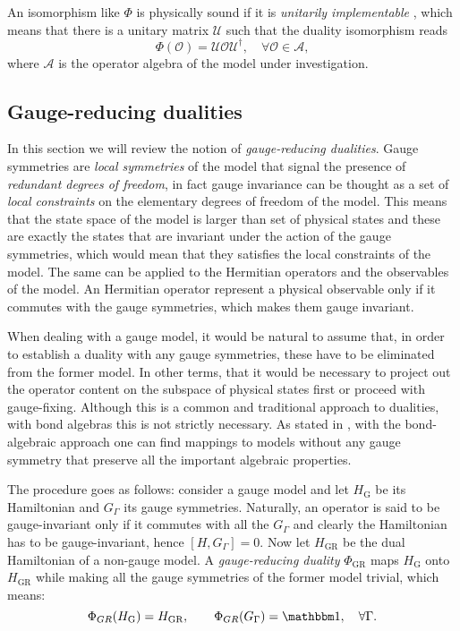 An isomorphism like $\Phi$ is physically sound if it is \emph{unitarily implementable} \cite{cobanera2011bond}, which means that there is a unitary matrix $\mathcal{U}$ such that the duality isomorphism reads
\begin{equation}
    \Phi(\mathcal{O}) =
    \mathcal{U} \mathcal{O} \mathcal{U}^{\dagger}, \quad
    \forall \mathcal{O} \in \mathcal{A},
\end{equation}
where $\mathcal{A}$ is the operator algebra of the model under investigation.



\subsection{Gauge-reducing dualities}%
\label{sub:gauge_reducing_dualities}

In this section we will review the notion of \emph{gauge-reducing dualities}.
Gauge symmetries are \emph{local symmetries} of the model that signal the presence of \emph{redundant degrees of freedom}, in fact gauge invariance can be thought as a set of \emph{local constraints} on the elementary degrees of freedom of the model.
This means that the state space of the model is larger than set of physical states and these are exactly the states that are invariant under the action of the gauge symmetries, which would mean that they satisfies the local constraints of the model.
The same can be applied to the Hermitian operators and the observables of the model.
An Hermitian operator represent a physical observable only if it commutes with the gauge symmetries, which makes them gauge invariant.

When dealing with a gauge model, it would be natural to assume that, in order to establish a duality with any gauge symmetries, these have to be eliminated from the former model.
In other terms, that it would be necessary to project out the operator content on the subspace of physical states first or proceed with gauge-fixing.
Although this is a common and traditional approach to dualities, with bond algebras this is not strictly necessary.
As stated in \cite{cobanera2011bond}, with the bond-algebraic approach one can find mappings to models without any gauge symmetry that preserve all the important algebraic properties.

The procedure goes as follows: consider a gauge model and let $H_{\text{G}}$ be its Hamiltonian and $G_{\Gamma}$ its gauge symmetries.
Naturally, an operator is said to be gauge-invariant only if it commutes with all the $G_{\Gamma}$ and
clearly the Hamiltonian has to be gauge-invariant, hence $[H, G_{\Gamma}] = 0$.
Now let $H_{\text{GR}}$ be the dual Hamiltonian of a non-gauge model.
A \emph{gauge-reducing duality} $\Phi_{\text{GR}}$ maps $H_{\text{G}}$ onto $H_{\text{GR}}$ while making all the gauge symmetries of the former model trivial, which means:
\begin{equation}
    \Phi_{GR}(H_{\text{G}}) = H_{\text{GR}}, \qquad
    \Phi_{GR}(G_{\Gamma}) = \identity, \quad \forall \Gamma.
\end{equation}

